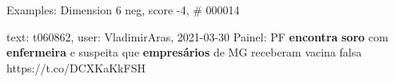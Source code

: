 \begin{frame}{Examples: Dimension 6 neg, score -4, \# 000014}
\footnotesize
\begin{alertblock}{text: t060862, user: VladimirAras, 2021-03-30}
Painel: PF \textbf{encontra} \textbf{soro} com \textbf{enfermeira} e suspeita 
que \textbf{empresários} de MG receberam vacina falsa https://t.co/DCXKaKkFSH 
\end{alertblock}
\end{frame}
